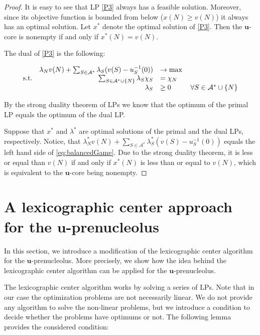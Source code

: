 \documentclass[a4paper,12pt]{article}
\theoremstyle{definition}
\theoremstyle{remark}
\begin{document}
\begin{proof}
It is easy to see that LP \eqref{P3} always has a feasible solution. Moreover, since its objective function is bounded from below ($x(N)\geq v(N)$) it always has an optimal solution. Let $x^*$ denote the optimal solution of \eqref{P3}. Then the $\mathbf{u}$-core is nonempty if and only if $x^*(N) = v(N)$.

The dual of \eqref{P3} is the following:

\begin{equation*}
\begin{array}{lrl}
& \lambda_N v(N) + \sum_{S\in \mathcal{A}^* } \lambda _S (v(S)-u_S^{-1}(0)) & \to \max \\
\textup{s.t.} &  \sum_{S\in \mathcal{A}^* \cup \{N\}} \lambda_S \chi_S & = \chi_N  \\
& \lambda_S & \geq 0 \mspace{50mu} \forall S \in \mathcal{A}^*\cup \{N\} \\   
\end{array}
\end{equation*}

By the strong duality theorem of LPs we know that the optimum of the primal LP equals the optimum of the dual LP.

Suppose that $x^*$ and $\lambda ^*$ are optimal solutions of the primal and the dual LPs, respectively. Notice, that $\lambda^*_N v(N) + \sum_{S\in \mathcal{A}^*} \lambda^* _S (v(S)-u_S^{-1}(0))$ equals the left hand side of \eqref{eq:balancedGame}. Due to the strong duality theorem, it is less or equal than $v(N)$ if and only if $x^*(N)$ is less than or equal to $v(N)$, which is equivalent to the $\mathbf{u}$-core being nonempty.
\end{proof}

\section{A lexicographic center approach for the $\mathbf{u}$-prenucleolus}\label{sec:lexi}

In this section, we introduce a modification of the lexicographic center algorithm \citep{Kopelowitz1967,MaschlerPelegShapley1979} for the $\mathbf{u}$-prenucleolus. More precisely, we show how the idea behind the lexicographic center algorithm can be applied for the $\mathbf{u}$-prenucleolus.

The lexicographic center algorithm works by solving a series of LPs. Note that in our case the optimization problems are not necessarily linear. We do not provide any algorithm to solve the non-linear problems, but we introduce a condition to decide whether the problems have optimums or not. %
The following lemma provides the considered condition:
\end{document}
